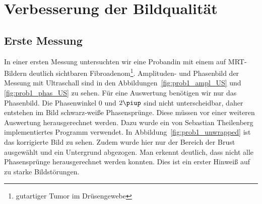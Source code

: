 \documentclass[
    11pt,
    ngerman
]{scrbook}
\begin{document}
\section{Verbesserung der Bildqualität}

\subsection{Erste Messung}

In einer ersten Messung untersuchten wir eine Probandin mit einem auf
MRT-Bildern deutlich sichtbaren Fibroadenom\footnote{gutartiger Tumor im
Drüsengewebe}. Amplituden- und Phasenbild der Messung mit Ultraschall sind in
den Abbildungen~\ref{fig:prob1_ampl_US} und \ref{fig:prob1_phas_US} zu sehen.
Für eine Auswertung benötigen wir nur das Phasenbild. Die Phasenwinkel 0 und
$2\piup$ sind nicht unterscheidbar, daher entstehen im Bild schwarz-weiße
Phasensprünge. Diese müssen vor einer weiteren Auswertung herausgerechnet
werden. Dazu wurde ein von Sebastian Theilenberg implementiertes Programm
verwendet. In Abbildung~\ref{fig:prob1_unwrapped} ist das korrigierte Bild zu
sehen. Zudem wurde hier nur der Bereich der Brust ausgewählt und ein
Untergrund abgezogen. Man erkennt deutlich, dass nicht alle Phasensprünge
herausgerechnet werden konnten. Dies ist ein erster Hinweiß auf zu starke
Bildstörungen.
\end{document}

